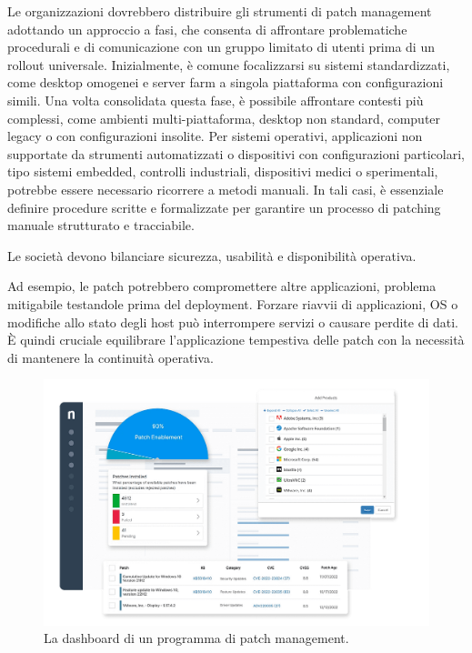                 Le organizzazioni dovrebbero distribuire gli strumenti di patch management adottando un approccio a fasi, che consenta di affrontare problematiche procedurali e di comunicazione con un gruppo limitato di utenti prima di un rollout universale. Inizialmente, è comune focalizzarsi su sistemi standardizzati, come desktop omogenei e server farm a singola piattaforma con configurazioni simili. Una volta consolidata questa fase, è possibile affrontare contesti più complessi, come ambienti multi-piattaforma, desktop non standard, computer legacy o con configurazioni insolite. Per sistemi operativi, applicazioni non supportate da strumenti automatizzati o dispositivi con configurazioni particolari, tipo sistemi embedded, controlli industriali, dispositivi medici o sperimentali, potrebbe essere necessario ricorrere a metodi manuali. In tali casi, è essenziale definire procedure scritte e formalizzate per garantire un processo di patching manuale strutturato e tracciabile.

                Le società devono bilanciare sicurezza, usabilità e disponibilità operativa. 
                
                Ad esempio, le patch potrebbero compromettere altre applicazioni, problema mitigabile testandole prima del deployment. Forzare riavvii di applicazioni, OS o modifiche allo stato degli host può interrompere servizi o causare perdite di dati. È quindi cruciale equilibrare l'applicazione tempestiva delle patch con la necessità di mantenere la continuità operativa.

            \begin{figure}[H]
                \centering
                \includegraphics[width=1.0\textwidth]{Immagini/patch_management.png}
                \caption{La dashboard di un programma di patch management\protect\footnotemark.}
                \label{fig:ninja_one_patch_man}
            \end{figure}
            

